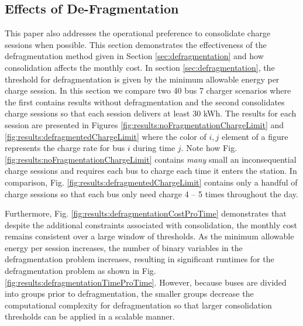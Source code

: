 \subsection{Effects of De-Fragmentation}
This paper also addresses the operational preference to consolidate charge sessions when possible. This section demonstrates the effectiveness of the defragmentation method given in Section \ref{sec:defragmentation} and how consolidation affects the monthly cost. In section \ref{sec:defragmentation}, the threshold for defragmentation is given by the minimum allowable energy per charge session. In this section we compare two 40 bus 7 charger scenarios where the first contains results without defragmentation and the second consolidates charge sessions so that each session delivers at least 30 kWh. The results for each session are presented in Figures \ref{fig:results:noFragmentationChargeLimit} and \ref{fig:results:defragmentedChargeLimit} where the color of $i,j$ element of a figure represents the charge rate for bus $i$ during time $j$. Note how Fig. \ref{fig:results:noFragmentationChargeLimit} contains {\it many} small an inconsequential charge sessions and requires each bus to charge each time it enters the station. In comparison, Fig. \ref{fig:results:defragmentedChargeLimit} contains only a handful of charge sessions so that each bus only need charge 4 -- 5 times throughout the day.  
\par Furthermore, Fig. \ref{fig:results:defragmentationCostProTime} demonstrates that despite the additional constraints associated with consolidation, the monthly cost remains consistent over a large window of thresholds. As the minimum allowable energy per session increases, the number of binary variables in the defragmentation problem increases, resulting in significant runtimes for the defragmentation problem as shown in Fig. \ref{fig:results:defragmentationTimeProTime}. However, because buses are divided into groups prior to defragmentation, the smaller groups decrease the computational complexity for defragmentation so that larger consolidation thresholds can be applied in a scalable manner. 

 


